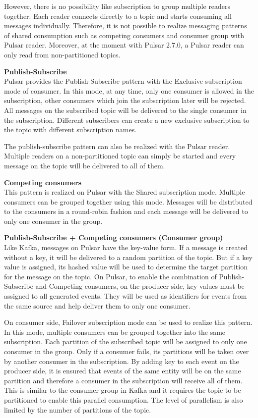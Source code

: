 However, there is no possibility like subscription to group multiple readers together. Each reader connects directly to a topic and starts consuming all messages individually. Therefore, it is not possible to realize messaging patterns of shared consumption such as competing consumers and consumer group with Pulsar reader. Moreover, at the moment with Pulsar 2.7.0, a Pulsar reader can only read from non-partitioned topics.

\textbf{Publish-Subscribe}\\
Pulsar provides the Publish-Subscribe pattern with the Exclusive subscription mode of consumer. In this mode, at any time, only one consumer is allowed in the subscription, other consumers which join the subscription later will be rejected. All messages on the subscribed topic will be delivered to the single consumer in the subscription. Different subscribers can create a new exclusive subscription to the topic with different subscription names.

The publish-subscribe pattern can also be realized with the Pulsar reader. Multiple readers on a non-partitioned topic can simply be started and every message on the topic will be delivered to all of them. 

\textbf{Competing consumers}\\
This pattern is realized on Pulsar with the Shared subscription mode. Multiple consumers can be grouped together using this mode. Messages will be distributed to the consumers in a round-robin fashion and each message will be delivered to only one consumer in the group.

\textbf{Publish-Subscribe + Competing consumers (Consumer group)}\\
Like Kafka, messages on Pulsar have the key-value form. If a message is created without a key, it will be delivered to a random partition of the topic. But if a key value is assigned, its hashed value will be used to determine the target partition for the message on the topic. On Pulsar, to enable the combination of Publish-Subscribe and Competing consumers, on the producer side, key values must be assigned to all generated events. They will be used as identifiers for events from the same source and help deliver them to only one consumer.

On consumer side, Failover subscription mode can be used to realize this pattern. In this mode, multiple consumers can be grouped together into the same subscription. Each partition of the subscribed topic will be assigned to only one consumer in the group. Only if a consumer fails, its partitions will be taken over by another consumer in the subscription. By adding key to each event on the producer side, it is ensured that events of the same entity will be on the same partition and therefore a consumer in the subscription will receive all of them. This is similar to the consumer group in Kafka and it requires the topic to be partitioned to enable this parallel consumption. The level of parallelism is also limited by the number of partitions of the topic. 

